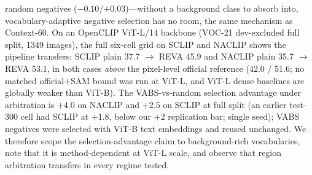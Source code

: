 \documentclass[11pt]{article}
\begin{document}
random negatives ($-0.10$/$+0.03$)---without a background class to absorb into,
vocabulary-adaptive negative
selection has no room, the same mechanism as Context-60. On an OpenCLIP ViT-L/14
backbone (VOC-21 dev-excluded full split, 1349 images), the full six-cell grid on
SCLIP and NACLIP shows
the pipeline transfers: SCLIP plain 37.7 $\to$ REVA 45.9 and NACLIP plain 35.7
$\to$ REVA 53.1, in both cases \emph{above} the pixel-level official reference
(42.0 / 51.6; no matched official$+$SAM bound was run at ViT-L, and ViT-L
dense baselines are globally weaker than ViT-B). The VABS-vs-random selection
advantage under arbitration is $+4.0$ on NACLIP and $+2.5$ on SCLIP at full split
(an earlier test-300 cell had SCLIP at $+1.8$, below our $+2$ replication bar;
single seed); VABS negatives were selected with ViT-B text embeddings and
reused unchanged.
We therefore scope the selection-advantage claim to background-rich
vocabularies, note that it is method-dependent at ViT-L scale, and observe
that region arbitration transfers in every regime tested.
\end{document}
